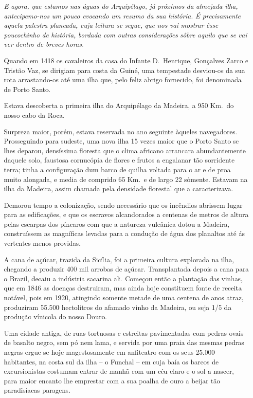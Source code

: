 \documentclass[9pt]{article}
\begin{document}
{\em E agora, que estamos nas águas do Arquipélago, já próximos da almejada i\-lha,
antecipemo-nos um pouco evocando um resumo da sua his\-tó\-ria. É precisamente
aquela palestra planeada, cuja leitura se segue, que nos vai mostrar êsse poucochinho de his\-tó\-ria, bordada com outras considera\-ções sôbre aquilo que se vai
ver dentro de breves horas.

Quando em 1418 os cavaleiros da casa do Infante D.\ Henrique, Gon\-çalves Zarco e Tristão Vaz, se dirigiam para costa da Guiné, uma tempestade des\-vi\-ou-os da sua rota arrastando-os até uma i\-lha que, pelo feliz abrigo fornecido, foi denominada de Porto Santo.

Estava descoberta a primeira i\-lha do Arquipélago da Madeira, a 950
Km.\ do nosso cabo da Roca.

Surpreza maior, porém, estava reservada no ano seguinte àqueles navegadores. Prosseguindo para sudeste, uma nova i\-lha 15 vezes maior que o
Porto Santo se lhes deparou, densíssima floresta que o clima africano arrancara abundantemente daquele solo, faustosa cornucópia de flores e frutos a engalanar tão sorridente terra; tinha a configura\-ção dum barco
de qui\-lha voltada para o ar e de proa muito alongada, e media de comprido
65 Km.\ e de largo 22 sòmente. Estavam na i\-lha da Madeira, assim chamada
pela densidade florestal que a ca\-ra\-cte\-ri\-zava.

Demorou tempo a coloniza\-ção, sendo necessário que os incêndios abrissem lugar para as edifi\-ca\-ções, e que os escravos alcandorados a centenas
de metros de altura pelas escarpas dos píncaros com que a natureza vulcânica dotou a Madeira, construíssem as magnífi\-cas levadas para a condu\-ção de água dos planaltos até ás vertentes menos providas.

A cana de açúcar, trazida da Sicília, foi a primeira cultura explorada na i\-lha, chegando a produzir 400 mil arrobas de açúcar. Transplantada
depois a cana para o Brazil, decaiu a indústria sacarina ali. Começou então a
planta\-ção das vinhas, que em 1846 as doenças  destruiram, mas ainda hoje
constituem fonte de receita notável, pois em 1920,
atingindo somente metade de uma centena de anos atraz, produziram 55.500
hectolitros do afamado vinho da Madeira, ou seja 1/5 da produ\-ção vínicola do nosso Douro.

Uma cidade antiga, de ruas tortuosas e estreitas pavimentadas com pedras ovais de basalto negro, sem pó
nem lama, e servida por uma praia das mesmas pedras negras ergue-se hoje magestosamente em anfiteatro com os seus 25.000 habitantes, na costa sul da
i\-lha -- o Funchal -- em cuja baía os barcos de excursionistas costumam entrar de
manhã com um céu claro e o sol a nascer, para maior encanto lhe emprestar com a sua poa\-lha de ouro a beijar tão paradisíacas
paragens.

}
\end{document}
